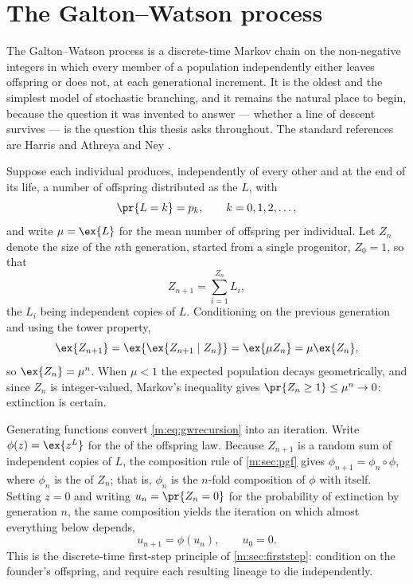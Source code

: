 \section{The Galton--Watson process}
\label{m:sec:gw}

The Galton--Watson process is a discrete-time Markov chain on the non-negative
integers in which every member of a population independently either leaves
offspring or does not, at each generational increment. It is the oldest and the
simplest model of stochastic branching, and it remains the natural place to begin,
because the question it was invented to answer --- whether a line of descent
survives --- is the question this thesis asks throughout. The standard references
are Harris \cite{Harris1963} and Athreya and Ney \cite{Athreya1972}.

Suppose each individual produces, independently of every other and at the end of
its life, a number of offspring distributed as the \rv{} $L$, with
\begin{equation*}
\pr{L = k} = p_k,\qquad k=0,1,2,\dots,
\end{equation*}
and write $\mu = \ex{L}$ for the mean number of offspring per individual. Let
$Z_n$ denote the size of the $n$th generation, started from a single progenitor,
$Z_0 = 1$, so that
\begin{equation}
\label{m:eq:gwrecursion}
Z_{n+1} = \sum_{i=1}^{Z_n}L_i ,
\end{equation}
the $L_i$ being independent copies of $L$. Conditioning on the previous generation
and using the tower property,
\begin{equation*}
\ex{Z_{n+1}} = \ex{\ex{Z_{n+1}\mid Z_n}} = \ex{\mu Z_n} = \mu\ex{Z_n},
\end{equation*}
so $\ex{Z_n} = \mu^n$. When $\mu<1$ the expected population decays geometrically,
and since $Z_n$ is integer-valued, Markov's inequality gives
$\pr{Z_n\ge1}\le\mu^n\to0$: extinction is certain.

Generating functions convert \cref{m:eq:gwrecursion} into an iteration. Write
$\phi(z) = \ex{z^{L}}$ for the \pgf{} of the offspring law. Because $Z_{n+1}$ is a
random sum of independent copies of $L$, the composition rule of \cref{m:sec:pgf}
gives $\phi_{n+1} = \phi_n\circ\phi$, where $\phi_n$ is the \pgf{} of $Z_n$; that
is, $\phi_n$ is the $n$-fold composition of $\phi$ with itself. Setting $z=0$ and
writing $u_n = \pr{Z_n=0}$ for the probability of extinction by generation $n$, the
same composition yields the iteration on which almost everything below depends,
\begin{equation}
\label{m:eq:iterPGF}
u_{n+1} = \phi(u_n),\qquad u_0 = 0 .
\end{equation}
This is the discrete-time first-step principle of \cref{m:sec:firststep}: condition
on the founder's offspring, and require each resulting lineage to die independently.


